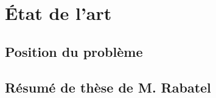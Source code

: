 

\chapter{État de l'art} %

\label{Chapter2} %










\section{Position du problème}
\label{sec:position}












\section{Résumé de thèse de M. Rabatel}














